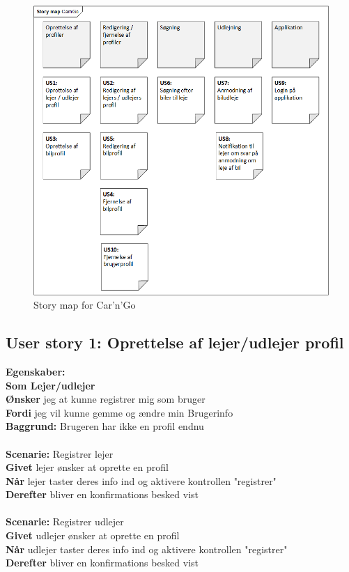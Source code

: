 \documentclass[Kravspecifikation/Kravspec_Main.tex]{subfiles}
\begin{document}
\begin{figure}[H]
    \centering
    \includegraphics[width=\textwidth]{Kravspecifikation/Funktionelle_krav/UserStories/graphics/Story_map.png}
    \caption{Story map for Car'n'Go}
    \label{fig:story_map}
\end{figure}

\subsection{User story 1: Oprettelse af lejer/udlejer profil}
\textbf{Egenskaber:} \\
\textbf{Som Lejer/udlejer}\\
\textbf{Ønsker} jeg at kunne registrer mig som bruger\\
\textbf{Fordi} jeg vil kunne gemme og ændre min Brugerinfo\\
\textbf{Baggrund:} Brugeren har ikke en profil endnu \\\\
\textbf{Scenarie:} Registrer lejer\\
\textbf{Givet} lejer ønsker at oprette en profil \\
\textbf{Når} lejer taster deres info ind og aktivere kontrollen "registrer" \\
\textbf{Derefter} bliver en konfirmations besked vist\\\\
\textbf{Scenarie:} Registrer udlejer\\
\textbf{Givet} udlejer ønsker at oprette en profil \\
\textbf{Når} udlejer taster deres info ind og aktivere kontrollen "registrer" \\
\textbf{Derefter} bliver en konfirmations besked vist
\end{document}
